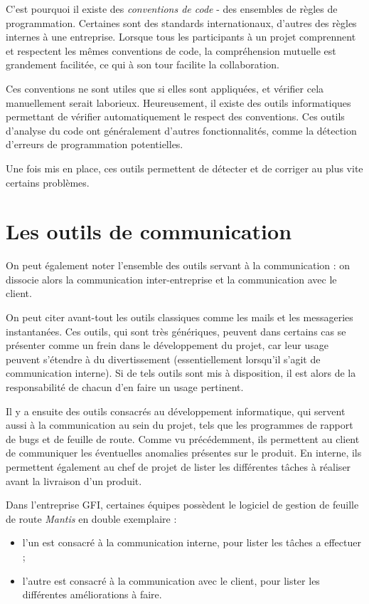 C’est pourquoi il existe des \textit{conventions de code} - des ensembles de règles de programmation. Certaines sont des standards internationaux, d’autres des règles internes à une entreprise. Lorsque tous les participants à un projet comprennent et respectent les mêmes conventions de code, la compréhension mutuelle est grandement facilitée, ce qui à son tour facilite la collaboration.

Ces conventions ne sont utiles que si elles sont appliquées, et vérifier cela manuellement serait laborieux. Heureusement, il existe des outils informatiques permettant de vérifier automatiquement le respect des conventions. Ces outils d’analyse du code ont généralement d’autres fonctionnalités, comme la détection d’erreurs de programmation potentielles.

Une fois mis en place, ces outils permettent de détecter et de corriger au plus vite certains problèmes.

\section{Les outils de communication}

On peut également noter l'ensemble des outils servant à la communication : on dissocie alors la communication inter-entreprise et la communication avec le client.

On peut citer avant-tout les outils classiques comme les mails et les messageries instantanées. Ces outils, qui sont très génériques, peuvent dans certains cas se présenter comme un frein dans le développement du projet, car leur usage peuvent s'étendre à du divertissement (essentiellement lorsqu'il s'agit de communication interne). Si de tels outils sont mis à disposition, il est alors de la responsabilité de chacun d'en faire un usage pertinent.

Il y a ensuite des outils consacrés au développement informatique, qui servent aussi à la communication au sein du projet, tels que les programmes de rapport de bugs et de feuille de route. Comme vu précédemment, ils permettent au client de communiquer les éventuelles anomalies présentes sur le produit. En interne, ils permettent également au chef de projet de lister les différentes tâches à réaliser avant la livraison d'un produit.

\begin{app}
Dans l'entreprise GFI, certaines équipes possèdent le logiciel de gestion de feuille de route \textit{Mantis} en double exemplaire :
\begin{itemize}
\item l'un est consacré à la communication interne, pour lister les tâches a effectuer ;
\item l'autre est consacré à la communication avec le client, pour lister les différentes améliorations à faire.
\end{itemize}
\end{app}

